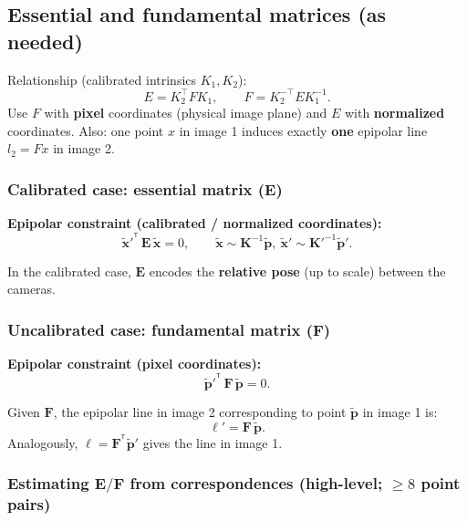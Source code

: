 \documentclass[11pt,a4paper]{article}
\newcommand{\vct}[1]{\bm{#1}}
\newcommand{\mat}[1]{\mathbf{#1}}
\newcommand{\T}{^\mathsf{T}}
\begin{document}
\subsection{Essential and fundamental matrices (as needed)}
\begin{mathrule}
Relationship (calibrated intrinsics $K_1,K_2$):
\[
E = K_2^{\top} F K_1,
\qquad
F = K_2^{-\top} E K_1^{-1}.
\]
Use $F$ with \textbf{pixel} coordinates (physical image plane) and $E$ with \textbf{normalized} coordinates.
Also: one point $x$ in image 1 induces exactly \textbf{one} epipolar line $l_2 = F x$ in image 2.
\end{mathrule}

\subsubsection{Calibrated case: essential matrix ($\mat{E}$)}

\begin{mathrule}
\textbf{Epipolar constraint (calibrated / normalized coordinates):}\quad
\[
\tilde{\vct{x}}'^{\T}\,\mat{E}\,\tilde{\vct{x}} = 0,
\qquad \tilde{\vct{x}}\sim \mat{K}^{-1}\tilde{\vct{p}},\ \tilde{\vct{x}}'\sim \mat{K}'^{-1}\tilde{\vct{p}}'.
\]
\end{mathrule}

\begin{notebox}
In the calibrated case, $\mat{E}$ encodes the \textbf{relative pose} (up to scale) between the cameras.
\end{notebox}

\subsubsection{Uncalibrated case: fundamental matrix ($\mat{F}$)}

\begin{mathrule}
\textbf{Epipolar constraint (pixel coordinates):}\quad
\[
\tilde{\vct{p}}'^{\T}\,\mat{F}\,\tilde{\vct{p}} = 0.
\]
\end{mathrule}

\begin{defbox}
Given $\mat{F}$, the epipolar line in image 2 corresponding to point $\tilde{\vct{p}}$ in image 1 is:
\[
\mat{\ell}' = \mat{F}\,\tilde{\vct{p}}.
\]
Analogously, $\mat{\ell} = \mat{F}^{\T}\tilde{\vct{p}}'$ gives the line in image 1.
\end{defbox}

\subsubsection{Estimating $\mat{E}/\mat{F}$ from correspondences (high-level; \texorpdfstring{$\ge 8$}{>=8} point pairs)}
\end{document}
